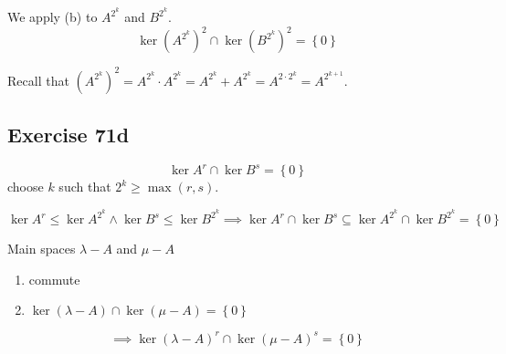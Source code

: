 \documentclass[a4paper]{article}
\theoremstyle{definition}
\newcommand\set[1]{\left\{#1\right\}}
\begin{document}
We apply (b) to $A^{2^k}$ and $B^{2^k}$.
\[ \ker(A^{2^k})^2 \cap \ker(B^{2^k})^2 = \set{0} \]

Recall that $(A^{2^k})^2 = A^{2^k} \cdot A^{2^k} = A^{2^k} + A^{2^k} = A^{2 \cdot 2^k} = A^{2^{k+1}}$.

\subsection{Exercise 71d}
\[ \ker{A^r} \cap \ker{B^s} = \set{0} \]
choose $k$ such that $2^k \geq \max(r, s)$.

\[ \ker{A^r} \leq \ker{A^{2^k}} \land \ker{B^s} \leq \ker{B^{2^k}} \implies \ker{A^r} \cap \ker{B^s} \subseteq \ker{A^{2^k}} \cap \ker{B^{2^k}} = \set{0} \]

Main spaces $\lambda - A$ and $\mu - A$
\begin{enumerate}
  \item commute
  \item $\ker(\lambda - A) \cap \ker(\mu - A) = \set{0}$
\end{enumerate}
\[ \implies \ker(\lambda - A)^r \cap \ker(\mu - A)^s = \set{0} \]
\end{document}
